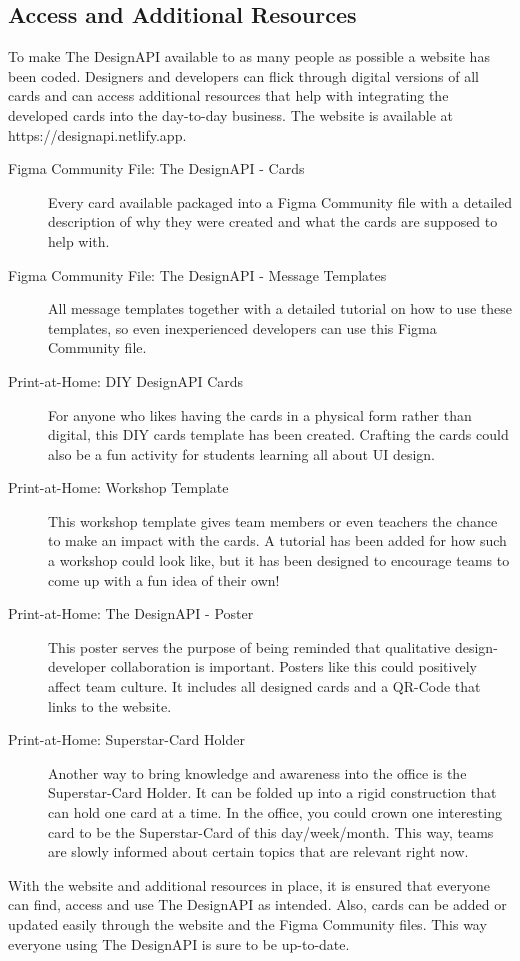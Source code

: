 \newpage
\subsection{Access and Additional Resources}
To make The DesignAPI available to as many people as possible a website has been coded.
Designers and developers can flick through digital versions of all cards and can access additional
resources that help with integrating the developed cards into the day-to-day business. The website
is available at https://designapi.netlify.app. 

\begin{description}
    \item[Figma Community File: The DesignAPI - Cards] Every card available packaged into a Figma
    Community file with a detailed description of why they were created and what the cards are
    supposed to help with.
    \item[Figma Community File: The DesignAPI - Message Templates] All message templates together
    with a detailed tutorial on how to use these templates, so even inexperienced developers can use
    this Figma Community file.
    \item[Print-at-Home: DIY DesignAPI Cards] For anyone who likes having the cards in a physical
    form rather than digital, this DIY cards template has been created. Crafting the cards could
    also be a fun activity for students learning all about UI design.
    \item[Print-at-Home: Workshop Template] This workshop template gives team members or even
    teachers the chance to make an impact with the cards. A tutorial has been added for how such a
    workshop could look like, but it has been designed to encourage teams to come up with a
    fun idea of their own! 
    \item[Print-at-Home: The DesignAPI - Poster] This poster serves the purpose of being reminded
    that qualitative design-developer collaboration is important. Posters like this could positively
    affect team culture. It includes all designed cards and a QR-Code that links to the website. 
    \item[Print-at-Home: Superstar-Card Holder] Another way to bring knowledge and awareness into
    the office is the Superstar-Card Holder. It can be folded up into a rigid construction that can
    hold one card at a time. In the office, you could crown one interesting card to be the
    Superstar-Card of this day/week/month. This way, teams are slowly informed about certain topics
    that are relevant right now.
\end{description}

With the website and additional resources in place, it is ensured that everyone can find, access and
use The DesignAPI as intended. Also, cards can be added or updated easily through the website and
the Figma Community files. This way everyone using The DesignAPI is sure to be up-to-date.
